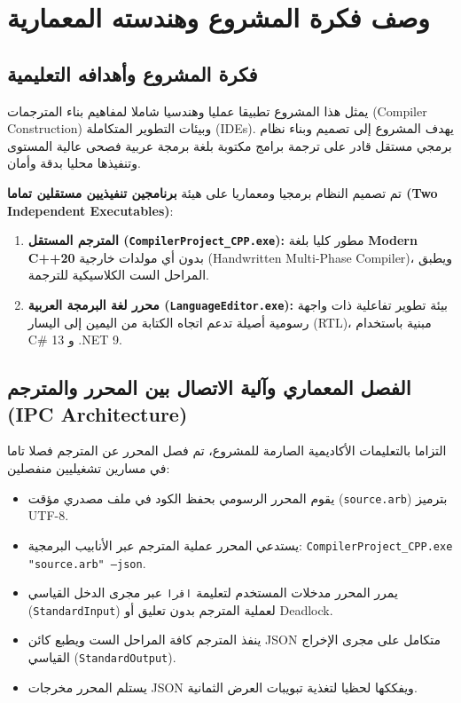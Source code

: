 \documentclass[11pt,a4paper,oneside]{report}
\begin{document}
\tableofcontents
\newpage

\chapter{وصف فكرة المشروع وهندسته المعمارية}

\section{فكرة المشروع وأهدافه التعليمية}
يمثل هذا المشروع تطبيقا عمليا وهندسيا شاملا لمفاهيم بناء المترجمات (Compiler Construction) وبيئات التطوير المتكاملة (IDEs). يهدف المشروع إلى تصميم وبناء نظام برمجي مستقل قادر على ترجمة برامج مكتوبة بلغة برمجة عربية فصحى عالية المستوى وتنفيذها محليا بدقة وأمان.

تم تصميم النظام برمجيا ومعماريا على هيئة \textbf{برنامجين تنفيذيين مستقلين تماما (Two Independent Executables)}:
\begin{enumerate}
    \item \textbf{المترجم المستقل (\texttt{CompilerProject\_CPP.exe}):} مطور كليا بلغة \textbf{Modern C++20} بدون أي مولدات خارجية (Handwritten Multi-Phase Compiler)، ويطبق المراحل الست الكلاسيكية للترجمة.
    \item \textbf{محرر لغة البرمجة العربية (\texttt{LanguageEditor.exe}):} بيئة تطوير تفاعلية ذات واجهة رسومية أصيلة تدعم اتجاه الكتابة من اليمين إلى اليسار (RTL)، مبنية باستخدام C\# 13 و .NET 9.
\end{enumerate}

\section{الفصل المعماري وآلية الاتصال بين المحرر والمترجم (IPC Architecture)}
التزاما بالتعليمات الأكاديمية الصارمة للمشروع، تم فصل المحرر عن المترجم فصلا تاما في مسارين تشغيليين منفصلين:
\begin{itemize}
    \item يقوم المحرر الرسومي بحفظ الكود في ملف مصدري مؤقت (\texttt{source.arb}) بترميز UTF-8.
    \item يستدعي المحرر عملية المترجم عبر الأنابيب البرمجية:
    \texttt{CompilerProject\_CPP.exe "source.arb" --json}.
    \item يمرر المحرر مدخلات المستخدم لتعليمة \texttt{اقرا} عبر مجرى الدخل القياسي (\texttt{StandardInput}) لعملية المترجم بدون تعليق أو Deadlock.
    \item ينفذ المترجم كافة المراحل الست ويطبع كائن JSON متكامل على مجرى الإخراج القياسي (\texttt{StandardOutput}).
    \item يستلم المحرر مخرجات JSON ويفككها لحظيا لتغذية تبويبات العرض الثمانية.
\end{itemize}
\end{document}
